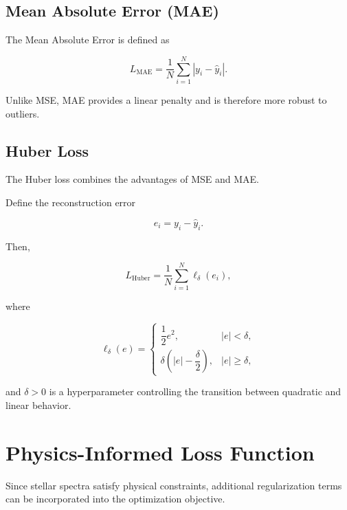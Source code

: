 \documentclass[11pt,a4paper]{article}
\begin{document}
\subsection{Mean Absolute Error (MAE)}

The Mean Absolute Error is defined as

\begin{equation}
L_{\mathrm{MAE}}
=
\frac{1}{N}
\sum_{i=1}^{N}
|y_i-\hat{y}_i|.
\end{equation}

Unlike MSE, MAE provides a linear penalty and is therefore more robust to outliers.


\subsection{Huber Loss}

The Huber loss combines the advantages of MSE and MAE.

Define the reconstruction error

\begin{equation}
e_i=y_i-\hat{y}_i.
\end{equation}

Then,

\begin{equation}
L_{\mathrm{Huber}}
=
\frac{1}{N}
\sum_{i=1}^{N}
\ell_{\delta}(e_i),
\end{equation}

where

\begin{equation}
\ell_{\delta}(e)=
\begin{cases}
\dfrac{1}{2}e^{2},
&
|e|<\delta,
\\[0.3cm]
\delta\left(|e|-\dfrac{\delta}{2}\right),
&
|e|\geq\delta,
\end{cases}
\end{equation}

and $\delta>0$ is a hyperparameter controlling the transition between quadratic and linear behavior.


\section{Physics-Informed Loss Function}

Since stellar spectra satisfy physical constraints, additional regularization terms can be incorporated into the optimization objective.
\end{document}
